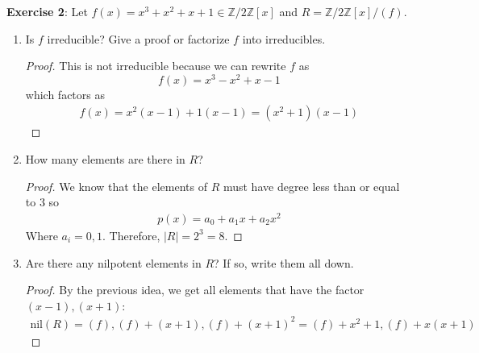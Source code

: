 \documentclass{article}
\begin{document}
\textbf{Exercise 2}: Let $f(x) = x^{3} + x^{2} + x + 1 \in \mathbb{Z}/2\mathbb{Z}[x]$ and $R = \mathbb{Z}/2\mathbb{Z}[x]/(f)$.
\begin{enumerate}
	\item Is $f$ irreducible? Give a proof or factorize $f$ into irreducibles.
		\begin{proof}
			This is not irreducible because we can rewrite $f$ as 
			\begin{equation*}
				f(x) = x^{3} - x^{2} + x - 1
			\end{equation*}
			which factors as
			\begin{align*}
				f(x) = x^{2}(x - 1) + 1(x - 1) = (x^{2} + 1)(x - 1)
			\end{align*}
		\end{proof}

	\item How many elements are there in $R$?
		\begin{proof}
			We know that the elements of $R$ must have degree less than or equal to 3 so 
            \begin{align*}
                p(x) = a_{0} + a_{1}x + a_{2}x^{2}
            \end{align*}
            Where $a_{i} = 0, 1$. Therefore, $\lvert R \rvert = 2^{3} = 8$.
		\end{proof}

	\item Are there any nilpotent elements in $R$? If so, write them all down.
		\begin{proof}
            By the previous idea, we get all elements that have the factor $(x - 1), (x + 1)$:
                \begin{align*}
                    \text{nil}(R) = (f), (f) + (x + 1), (f) + (x + 1)^{2} = (f) + x^{2} + 1, (f) + x(x + 1)
                \end{align*}
		\end{proof}
\end{enumerate}
\end{document}
